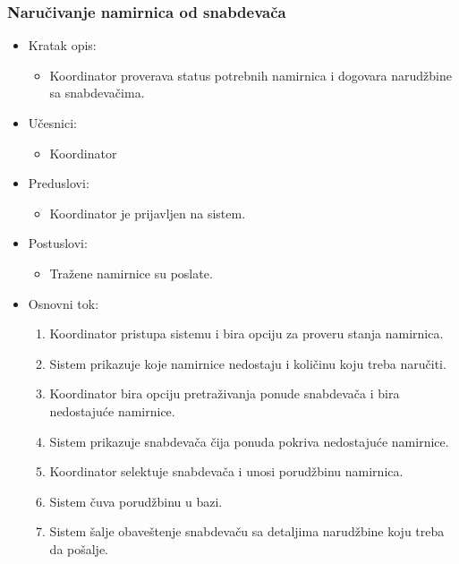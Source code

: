 

\subsubsection{Naručivanje namirnica od snabdevača}


\begin{itemize}
	\item Kratak opis:
		\begin{itemize}
			\item Koordinator proverava status potrebnih namirnica i dogovara narudžbine sa snabdevačima.
		\end{itemize}
	\item Učesnici:
		\begin{itemize}
		    \item Koordinator
		\end{itemize}
	\item Preduslovi:
		\begin{itemize}
		    \item Koordinator je prijavljen na sistem.
		\end{itemize}
	\item Postuslovi:
		\begin{itemize}
			\item Tražene namirnice su poslate.
	\end{itemize}
	\item Osnovni tok:
		\begin{enumerate}
            \item Koordinator pristupa sistemu i bira opciju za proveru stanja namirnica.
           \item Sistem prikazuje koje namirnice nedostaju i količinu koju treba naručiti.
           \item Koordinator bira opciju pretraživanja ponude snabdevača i bira nedostajuće namirnice.
            \item Sistem prikazuje snabdevača čija ponuda pokriva nedostajuće namirnice. 
             \item  Koordinator selektuje snabdevača i unosi porudžbinu namirnica.
              \item Sistem čuva porudžbinu u bazi.
             \item Sistem šalje obaveštenje snabdevaču sa detaljima narudžbine koju treba da pošalje.
            

\end{enumerate}
\end{itemize}
